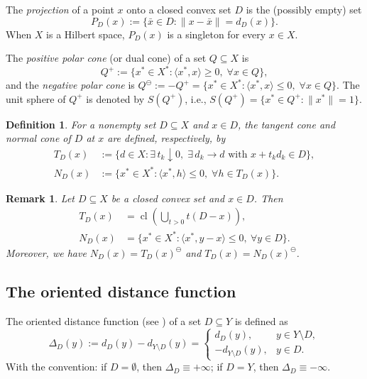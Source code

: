 \documentclass[10pt,a4paper]{amsart}
\DeclareMathOperator{\cl}{cl}
\newtheorem{definition}{Definition}[section]
\newtheorem{remark}{Remark}[section]
\begin{document}
The \emph{projection} of a point $x$ onto a closed convex set $D$ is the (possibly empty) set
\[
P_D(x) := \{\bar{x} \in D : \|x - \bar{x}\| = d_D(x)\}.
\]
When $X$ is a Hilbert space, $P_D(x)$ is a singleton for every $x \in X$.

 

The \emph{positive polar cone} (or dual cone) of a set $Q \subseteq X$ is
\[
Q^+ := \{x^* \in X^* : \langle x^*, x \rangle \geq 0, \; \forall x \in Q\},
\]
and the \emph{negative polar cone} is $Q^\ominus := -Q^+ = \{x^* \in X^* : \langle x^*, x \rangle \leq 0, \; \forall x \in Q\}$.    The unit sphere of \(Q^+\) is denoted by \(S(Q^+)\), i.e., \(S(Q^+) = \{ x^* \in Q^+ : \|x^*\| = 1 \}\).

 
\begin{definition}  
 For a nonempty set $D \subseteq X$ and $x \in D$, the \emph{tangent cone} and \emph{normal cone} of  $D$ at  $x$ are defined, respectively, by  
 \begin{align*}
 	T_D(x) &:= \bigl\{ d \in X : \exists\, t_k \downarrow 0,\; \exists\, d_k \to d \text{ with } x + t_k d_k \in D \bigr\},\\
 	N_D(x) &:= \{x^* \in X^* : \langle x^*, h \rangle \leq 0, \; \forall h \in T_D(x)\}.
 \end{align*}
  \end{definition}

 

\begin{remark} \label{RtDFxl}    \cite{Zalinescu2002, AE1984}    Let  $D \subseteq X$ be a closed convex set  and $x \in D$.  Then
	\begin{align*}
		T_D(x) &= \cl \left( \bigcup_{t > 0} t(D - x) \right),\\
		N_D(x) &= \{ x^* \in X^* : \langle x^*, y - x \rangle \le 0,\ \forall y \in D \}.  
	\end{align*}
	Moreover, we have  $N_D(x) = T_D(x)^\ominus$ and $T_D(x) = N_D(x)^\ominus$.
\end{remark}


 

\subsection{The  oriented distance function}

The oriented distance function (see \cite{Hiriart1,Hiriart2}) of a set $D \subseteq Y$ is defined as
$$
\Delta_D(y) := d_D(y) - d_{Y \setminus D}(y) = \begin{cases}
	d_D(y), & y \in Y \setminus D, \\
	-d_{Y \setminus D}(y), & y \in D.
\end{cases}
$$
With the convention: if $D = \emptyset$, then $\Delta_D \equiv +\infty$; if $D = Y$, then $\Delta_D \equiv -\infty$.
\end{document}
